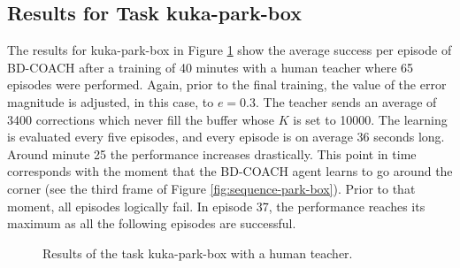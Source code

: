 \subsection{Results for Task kuka-park-box}
\label{subsection:results_kuka_park}

The results for kuka-park-box in Figure \ref{fig:kukapark} show the average success per episode of BD-COACH after a training of 40 minutes with a human teacher where 65 episodes were performed. Again, prior to the final training, the value of the error magnitude is adjusted, in this case, to $e=0.3$. The teacher sends an average of 3400 corrections which never fill the buffer whose $K$ is set to 10000. The learning is evaluated every five episodes, and every episode is on average 36 seconds long. Around minute 25 the performance increases drastically. This point in time corresponds with the moment that the BD-COACH agent learns to go around the corner (see the third frame of Figure \ref{fig:sequence-park-box}). Prior to that moment, all episodes logically fail. In episode 37, the performance reaches its maximum as all the following episodes are successful.



 \begin{figure}[H]
  \centering

   \caption{Results of the task kuka-park-box with a human teacher.}
  \label{fig:kukapark}
\end{figure}




